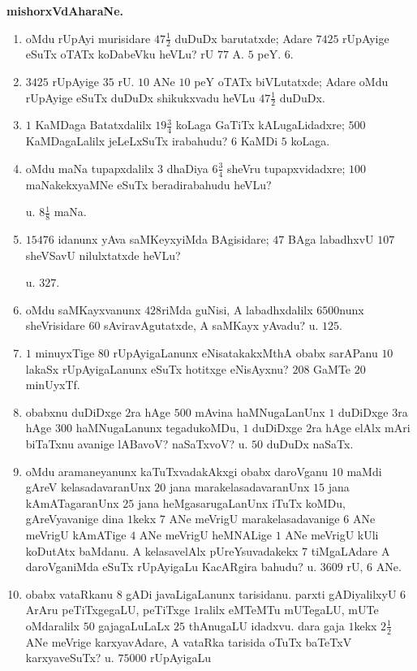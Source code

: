 \medskip

\begin{center}
{\bf\large {mishorxVdAharaNe.}}
\end{center}

\begin{enumerate}[\rm(1)]
\item oMdu rUpAyi murisidare $47\frac{1}{2}$ duDuDx barutatxde; Adare $7425$ rUpAyige eSuTx oTATx koDabeVku heVLu? \hfill rU $77$ A. $5$ peY. $6.$

\item $3425$ rUpAyige $35$ rU. $10$ ANe $10$ peY oTATx biVLutatxde; Adare oMdu rUpAyige eSuTx duDuDx shikukxvadu heVLu \hfill $47\frac{1}{2}$ duDuDx.

\item $1$ KaMDaga Batatxdalilx $19\frac{3}{4}$ koLaga GaTiTx kALugaLidadxre; $500$ KaMDagaLalilx jeLeLxSuTx irabahudu? \hfill $6$ KaMDi $5$ koLaga.

\item oMdu maNa tupapxdalilx $3$ dhaDiya $6\frac{3}{4}$ sheVru tupapxvidadxre; $100$ maNakekxyaMNe eSuTx beradirabahudu heVLu? 

\hfill u. $8\frac{1}{8}$ maNa.

\item $15476$ idanunx yAva saMKeyxyiMda BAgisidare; $47$ BAga labadhxvU $107$ sheVSavU nilulxtatxde heVLu? 

\hfill u. $327.$

\item oMdu saMKayxvanunx $428$riMda guNisi, A labadhxdalilx $6500$nunx sheVrisidare $60$ sAviravAgutatxde, A saMKayx yAvadu?  
\hfill u. $125.$

\item $1$ minuyxTige $80$ rUpAyigaLanunx eNisatakakxMthA obabx sarAPanu $10$ lakaSx rUpAyigaLanunx eSuTx hotitxge eNisAyxnu? \hfill $208$ GaMTe $20$ minUyxTf.

\item obabxnu duDiDxge $2$ra hAge $500$ mAvina haMNugaLanUnx $1$ duDiDxge $3$ra hAge $300$ haMNugaLanunx tegadukoMDu, $1$ duDiDxge $2$ra hAge elAlx mAri biTaTxnu avanige lABavoV? naSaTxvoV? \hfill u. $50$ duDuDx naSaTx.

\item oMdu aramaneyanunx kaTuTxvadakAkxgi obabx daroVganu $10$ maMdi gAreV kelasadavaranUnx $20$ jana marakelasadavaranUnx $15$ jana kAmATagaranUnx $25$ jana heMgasarugaLanUnx iTuTx koMDu, gAreVyavanige dina $1$kekx $7$ ANe meVrigU marakelasadavanige $6$ ANe meVrigU kAmATige $4$ ANe meVrigU heMNALige $1$ ANe meVrigU kUli koDutAtx baMdanu. A kelasavelAlx pUreYsuvadakekx $7$ tiMgaLAdare A daroVganiMda eSuTx rUpAyigaLu KacARgira bahudu? \hfill u. $3609$ rU, $6$ ANe.

\item obabx vataRkanu $8$ gADi javaLigaLanunx tarisidanu. parxti gADiyalilxyU $6$ ArAru peTiTxgegaLU, peTiTxge $1$ralilx eMTeMTu mUTegaLU, mUTe oMdaralilx $50$ gajagaLuLaLx $25$ thAnugaLU idadxvu. dara gaja $1$kekx $2\frac{1}{2}$ ANe meVrige karxyavAdare, A vataRka tarisida oTuTx baTeTxV karxyaveSuTx? \hfill u. $75000$ rUpAyigaLu
\end{enumerate}

